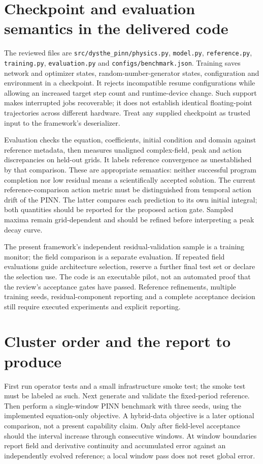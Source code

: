\documentclass[11pt]{article}
\begin{document}
\section{Checkpoint and evaluation semantics in the delivered code}
The reviewed files are \texttt{src/dysthe\_pinn/physics.py}, \texttt{model.py}, \texttt{reference.py}, \texttt{training.py}, \texttt{evaluation.py} and \texttt{configs/benchmark.json}. Training saves network and optimizer states, random-number-generator states, configuration and environment in a checkpoint. It rejects incompatible resume configurations while allowing an increased target step count and runtime-device change. Such support makes interrupted jobs recoverable; it does not establish identical floating-point trajectories across different hardware. Treat any supplied checkpoint as trusted input to the framework's deserializer.

Evaluation checks the equation, coefficients, initial condition and domain against reference metadata, then measures unaligned complex-field, peak and action discrepancies on held-out grids. It labels reference convergence as unestablished by that comparison. These are appropriate semantics: neither successful program completion nor low residual means a scientifically accepted solution. The current reference-comparison action metric must be distinguished from temporal action drift of the PINN. The latter compares each prediction to its own initial integral; both quantities should be reported for the proposed action gate. Sampled maxima remain grid-dependent and should be refined before interpreting a peak decay curve.

The present framework's independent residual-validation sample is a training monitor; the field comparison is a separate evaluation. If repeated field evaluations guide architecture selection, reserve a further final test set or declare the selection use. The code is an executable pilot, not an automated proof that the review's acceptance gates have passed. Reference refinements, multiple training seeds, residual-component reporting and a complete acceptance decision still require executed experiments and explicit reporting.

\section{Cluster order and the report to produce}
First run operator tests and a small infrastructure smoke test; the smoke test must be labeled as such. Next generate and validate the fixed-period reference. Then perform a single-window PINN benchmark with three seeds, using the implemented equation-only objective. A hybrid-data objective is a later optional comparison, not a present capability claim. Only after field-level acceptance should the interval increase through consecutive windows. At window boundaries report field and derivative continuity and accumulated error against an independently evolved reference; a local window pass does not reset global error.
\end{document}
